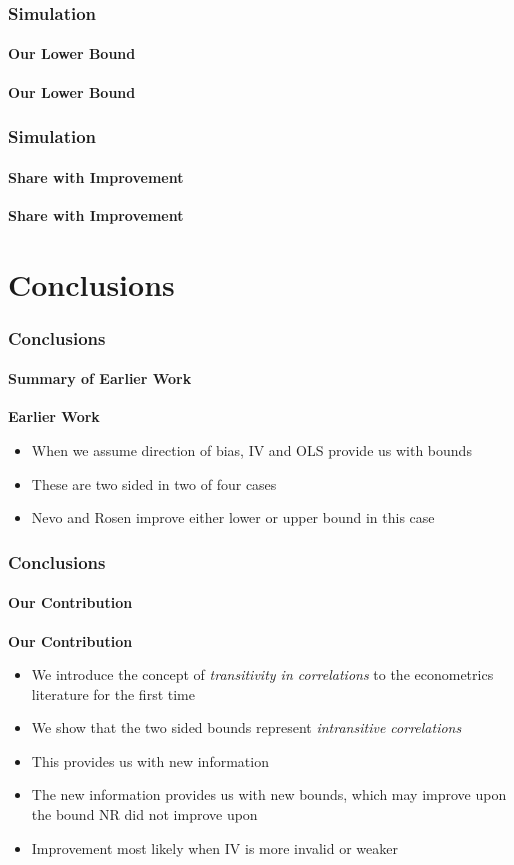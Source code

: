 \documentclass{beamer}
\begin{document}
\begin{frame}
\frametitle{Simulation}
\framesubtitle{Our Lower Bound}
\textbf{Our Lower Bound} \\ \pause
\footnotesize{

}
\end{frame}

\begin{frame}
\frametitle{Simulation}
\framesubtitle{Share with Improvement}
\textbf{Share with Improvement} \\ \pause
\footnotesize{

}
\end{frame}

\section{Conclusions}

\begin{frame}
\frametitle{Conclusions}
\framesubtitle{Summary of Earlier Work}
\textbf{Earlier Work} \\ \bigskip \pause

\begin{itemize}
  \item When we assume direction of bias, IV and OLS provide us with bounds \pause
  \item These are two sided in two of four cases \pause
  \item Nevo and Rosen improve either lower or upper bound in this case
\end{itemize}

\end{frame}

\begin{frame}
\frametitle{Conclusions}
\framesubtitle{Our Contribution}
\textbf{Our Contribution} \\ \bigskip \pause

\begin{itemize}
  \item We introduce the concept of \emph{transitivity in correlations} to the econometrics literature for the first time \pause
  \item We show that the two sided bounds represent \emph{intransitive correlations} \pause
  \item This provides us with new information \pause
  \item The new information provides us with new bounds, which may improve upon the bound NR did not improve upon \pause
  \item Improvement most likely when IV is more invalid or weaker \pause
\end{itemize}

\end{frame}
\end{document}
